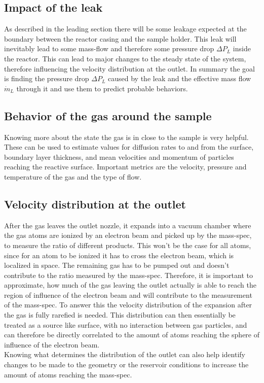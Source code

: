 \subsection{Impact of the leak}

	As described in the leading section there will be some leakage expected at the boundary between the reactor casing and the sample holder.
	This leak will inevitably lead to some mass-flow and therefore some pressure drop $\Delta P_L$ inside the reactor.
	This can lead to major changes to the steady state of the system, therefore influencing the velocity distribution at the outlet.
	In summary the goal is finding the pressure drop $\Delta P_L$ caused by the leak and the effective mass flow $\dot{m}_L$ through it and use them to predict probable behaviors.

\subsection{Behavior of the gas around the sample}

	Knowing more about the state the gas is in close to the sample is very helpful.
	These can be used to estimate values for diffusion rates to and from the surface, boundary layer thickness, and mean velocities and momentum of particles reaching the reactive surface. 
	Important metrics are the velocity, pressure and temperature of the gas and the type of flow.

\subsection{Velocity distribution at the outlet}

	After the gas leaves the outlet nozzle, it expands into a vacuum chamber where the gas atoms are ionized by an electron beam and picked up by the mass-spec, to measure the ratio of different products.
	This won't be the case for all atoms, since for an atom to be ionized it has to cross the electron beam, which is localized in space.
	The remaining gas has to be pumped out and doesn't contribute to the ratio measured by the mass-spec.
	Therefore, it is important to approximate, how much of the gas leaving the outlet actually is able to reach the region of influence of the electron beam and will contribute to the measurement of the mass-spec.
	To answer this the velocity distribution of the expansion after the gas is fully rarefied is needed.
	This distribution can then essentially be treated as a source like surface, with no interaction between gas particles, and can therefore be directly correlated to the amount of atoms reaching the sphere of influence of the electron beam.\\
	Knowing what determines the distribution of the outlet can also help identify changes to be made to the geometry or the reservoir conditions to increase the amount of atoms reaching the mass-spec.
